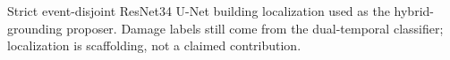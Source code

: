 \begin{table}[t]
\centering
\caption{Strict event-disjoint ResNet34 U-Net building localization used as the
hybrid-grounding proposer. Damage labels still come from the dual-temporal
classifier; localization is scaffolding, not a claimed contribution.}
\label{tab:loc-metrics}
\resizebox{\columnwidth}{!}{
}
\end{table}
